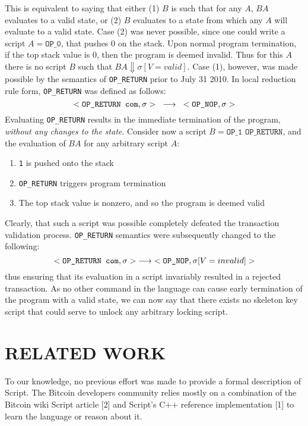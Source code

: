 \documentclass[letterpaper, 10 pt, conference]{ieeeconf}
\begin{document}
This is equivalent to saying that either (1) $B$ is such that for any $A$, $BA$ evaluates to a valid state, or (2) $B$ evaluates to a state from which any $A$ will evaluate to a valid state. Case (2) was never possible, since one could write a script $A = \texttt{OP\_0}$, that pushes 0 on the stack. Upon normal program termination, if the top stack value is 0, then the program is deemed invalid. Thus for this $A$ there is no script $B$ such that $BA \Downarrow \sigma[V=valid]$. Case (1), however, was made possible by the semantics of \texttt{OP\_RETURN} prior to July 31 2010. In local reduction rule form, \texttt{OP\_RETURN} was defined as follows:
%
$$<\texttt{OP\_RETURN com}, \sigma> \hspace{3mm} \longrightarrow \hspace{3mm} <\texttt{OP\_NOP}, \sigma>$$
%
Evaluating \texttt{OP\_RETURN} results in the immediate termination of the program, \textit{without any changes to the state}. Consider now a script $B = \texttt{OP\_1 OP\_RETURN}$, and the evaluation of $BA$ for any arbitrary script $A$:

\begin{enumerate}
  \item \texttt{1} is pushed onto the stack
  \item \texttt{OP\_RETURN} triggers program termination
  \item The top stack value is nonzero, and so the program is deemed valid
\end{enumerate}

Clearly, that such a script was possible completely defeated the transaction validation process. \texttt{OP\_RETURN} semantics were subsequently changed to the following:
%
$$<\texttt{OP\_RETURN com}, \sigma> \hspace{1mm} \longrightarrow \hspace{1mm} <\texttt{OP\_NOP}, \sigma[V=invalid]>$$
%
thus ensuring that its evaluation in a script invariably resulted in a rejected transaction.
As no other command in the language can cause early termination of the program with a valid state, we can now say that there exists no skeleton key script that could serve to unlock any arbitrary locking script.

\section{RELATED WORK}

To our knowledge, no previous effort was made to provide a formal description of Script. The Bitcoin developers community relies mostly on a combination of the Bitcoin wiki Script article [2] and Script's C++ reference implementation [1] to learn the language or reason about it.
\end{document}
